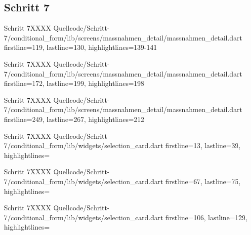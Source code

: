 \ifincludeall \clearpage \fi 


\subsection{Schritt 7}


  \begin{alexlisting}{Schritt 7}{XXXX}
    {Quellcode/Schritt-7/conditional_form/lib/screens/massnahmen_detail/massnahmen_detail.dart}
    {firstline=119, lastline=130, highlightlines={139-141}}
    \label{lst:Schritt7XXXXX}
  \end{alexlisting}

  \begin{alexlisting}{Schritt 7}{XXXX}
    {Quellcode/Schritt-7/conditional_form/lib/screens/massnahmen_detail/massnahmen_detail.dart}
    {firstline=172, lastline=199, highlightlines={198}}
    \label{lst:Schritt7XXXXX}
  \end{alexlisting}

  \begin{alexlisting}{Schritt 7}{XXXX}
    {Quellcode/Schritt-7/conditional_form/lib/screens/massnahmen_detail/massnahmen_detail.dart}
    {firstline=249, lastline=267, highlightlines={212}}
    \label{lst:Schritt7XXXXX}
  \end{alexlisting}



  \begin{alexlisting}{Schritt 7}{XXXX}
    {Quellcode/Schritt-7/conditional_form/lib/widgets/selection_card.dart}
    {firstline=13, lastline=39, highlightlines={}}
    \label{lst:Schritt7XXXX}
\end{alexlisting}

\begin{alexlisting}{Schritt 7}{XXXX}
  {Quellcode/Schritt-7/conditional_form/lib/widgets/selection_card.dart}
  {firstline=67, lastline=75, highlightlines={}}
  \label{lst:Schritt7XXXX}
\end{alexlisting}

\begin{alexlisting}{Schritt 7}{XXXX}
  {Quellcode/Schritt-7/conditional_form/lib/widgets/selection_card.dart}
  {firstline=106, lastline=129, highlightlines={}}
  \label{lst:Schritt7XXXX}
\end{alexlisting}
\ifincludeall \clearpage \fi 

